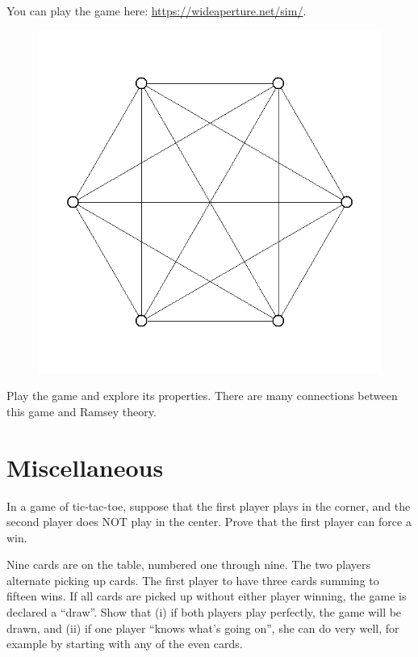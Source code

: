 \documentclass{article}
\begin{document}
You can play the game here: \url{https://wideaperture.net/sim/}.

\begin{figure}[hbt!]
    \small
    \centering
    \includegraphics[scale = 0.3]{pics/Complex_network_K6_complete_graph.png}
\end{figure}

\begin{exercise}
    Play the game and explore its properties.
    There are many connections between this game and Ramsey theory.
\end{exercise}

\section{Miscellaneous}

\begin{exercise}
    In a game of tic-tac-toe, suppose that the first player plays in the corner, and the second player does NOT play in the center.
    Prove that the first player can force a win.
\end{exercise}

\begin{exercise}
    Nine cards are on the table, numbered one through nine. The two players alternate picking up cards. The first player to have three cards summing to fifteen wins. If all cards are picked up without either player winning, the game is declared a ``draw''. Show that (i) if both players play perfectly, the game will be drawn, and (ii) if one player ``knows what's going on'', she can do very well, for example by starting with any of the even cards.
\end{exercise}
\end{document}
